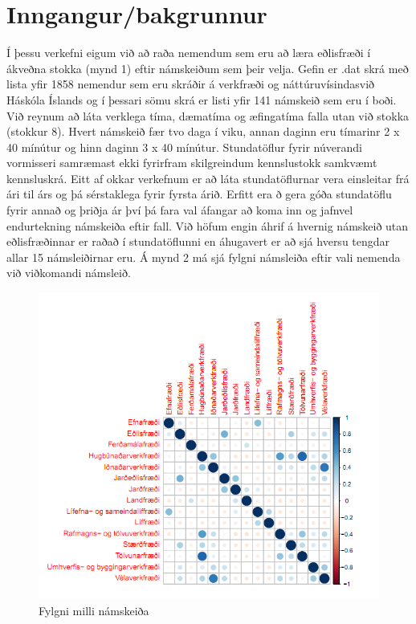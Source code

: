 \documentclass[a4paper,12pt]{article}
\begin{document}
\section{Inngangur/bakgrunnur}
Í þessu verkefni eigum við að raða nemendum sem eru að læra eðlisfræði í ákveðna stokka (mynd 1) eftir námskeiðum sem þeir velja. Gefin er .dat skrá með lista yfir 1858 nemendur sem eru skráðir á verkfræði og náttúruvísindasvið Háskóla Íslands og í þessari sömu skrá er listi yfir 141 námskeið sem eru í boði. Við reynum að láta verklega tíma, dæmatíma og æfingatíma falla utan við stokka (stokkur 8). Hvert námskeið fær tvo daga í viku, annan daginn eru tímarinr 2 x 40 mínútur og hinn daginn 3 x 40 mínútur.
Stundatöflur fyrir núverandi vormisseri samræmast ekki fyrirfram skilgreindum kennslustokk samkvæmt kennsluskrá. Eitt af okkar verkefnum er að láta stundatöflurnar vera einsleitar frá ári til árs og þá sérstaklega fyrir fyrsta árið. Erfitt era ð gera góða stundatöflu fyrir annað og þriðja ár því þá fara val áfangar að koma inn og jafnvel endurtekning námskeiða eftir fall.
Við höfum engin áhrif á hvernig námskeið utan eðlisfræðinnar er raðað í stundatöflunni en áhugavert er að sjá hversu tengdar allar 15 námsleiðirnar eru. Á mynd 2 má sjá fylgni námsleiða eftir vali nemenda við viðkomandi námsleið.


\begin{figure}[ht!]
\centering
\includegraphics[scale=0.6]{thyrping}
\caption{Fylgni milli námskeiða}
\label{fig: thyrping}
\end{figure}
\pagebreak
\end{document}
